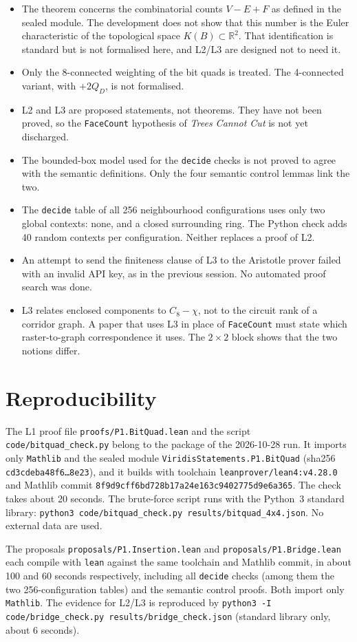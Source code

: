 \documentclass[11pt]{article}
\theoremstyle{definition}
\theoremstyle{remark}
\begin{document}
\begin{itemize}
\item The theorem concerns the combinatorial counts $V-E+F$ as defined in the
  sealed module. The development does not show that this number is the Euler
  characteristic of the topological space $K(B)\subset\mathbb{R}^2$. That
  identification is standard but is not formalised here, and L2/L3 are
  designed not to need it.
\item Only the 8-connected weighting of the bit quads is treated. The
  4-connected variant, with $+2Q_D$, is not formalised.
\item L2 and L3 are proposed statements, not theorems. They have not been
  proved, so the \texttt{FaceCount} hypothesis of \emph{Trees Cannot Cut} is
  not yet discharged.
\item The bounded-box model used for the \texttt{decide} checks is not proved
  to agree with the semantic definitions. Only the four semantic control lemmas
  link the two.
\item The \texttt{decide} table of all 256 neighbourhood configurations
  uses only two global contexts: none, and a closed surrounding ring. The Python
  check adds 40 random contexts per configuration. Neither replaces a proof of
  L2.
\item An attempt to send the finiteness clause of L3 to the Aristotle prover
  failed with an invalid API key, as in the previous session. No automated
  proof search was done.
\item L3 relates enclosed components to $C_8-\chi$, not to the circuit rank of
  a corridor graph. A paper that uses L3 in place of \texttt{FaceCount} must
  state which raster-to-graph correspondence it uses. The $2\times2$ block
  shows that the two notions differ.
\end{itemize}

\section{Reproducibility}
{\sloppy

The L1 proof file \texttt{proofs/P1.BitQuad.lean} and the script
\texttt{code/bitquad\_check.py} belong to the package of the 2026-10-28 run. It imports only
\texttt{Mathlib} and the sealed module \texttt{ViridisStatements.P1.BitQuad}
(sha256 \texttt{cd3cdeba48f6\ldots{}8e23}), and it builds with toolchain
\texttt{leanprover/lean4:v4.28.0} and Mathlib commit
\texttt{8f9d9cff6bd728b17a24e163c9402775d9e6a365}. The check takes about 20
seconds. The brute-force script runs with the Python~3 standard library:
\texttt{python3 code/bitquad\_check.py results/bitquad\_4x4.json}. No external
data are used.

The proposals \texttt{proposals/P1.Insertion.lean} and
\texttt{proposals/P1.Bridge.lean} each compile with \texttt{lean} against the
same toolchain and Mathlib commit, in about 100 and 60 seconds respectively,
including all \texttt{decide} checks (among them the two 256-configuration
tables) and the semantic control proofs. Both import only \texttt{Mathlib}. The evidence
for L2/L3 is reproduced by \texttt{python3 -I code/bridge\_check.py
results/bridge\_check.json} (standard library only, about 6 seconds).

}
\end{document}
